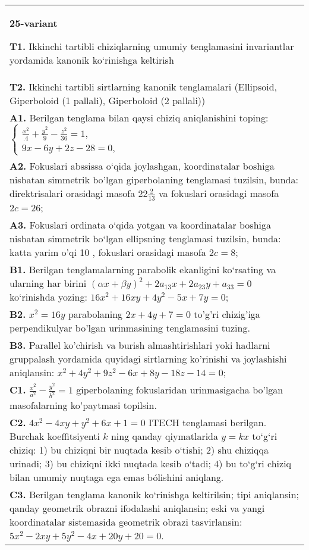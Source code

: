 \documentclass{article}
\begin{document}
\begin{tabular}{m{17cm}}
\textbf{25-variant}
\newline

\textbf{T1.} Ikkinchi tartibli chiziqlarning umumiy tenglamasini invariantlar yordamida kanonik ko‘rinishga keltirish \\
\textbf{T2.} Ikkinchi tartibli sirtlarning kanonik tenglamalari (Ellipsoid, Giperboloid (1 pallali), Giperboloid (2 pallali)) \\
\textbf{A1.} Berilgan tenglama bilan qaysi chiziq aniqlanishini toping: $\left\{\begin{array}{l}\frac{x^2}{.4}+\frac{y^2}{9}-\frac{z^2}{36}=1, \\ 9 x-6 y+2 z-28=0,\end{array}\right.$ \\
\textbf{A2.} Fokuslari abssissa o‘qida joylashgan, koordinatalar boshiga nisbatan simmetrik bo'lgan giperbolaning tenglamasi tuzilsin, bunda: direktrisalari orasidagi masofa $22 \frac{2}{13}$ va fokuslari orasidagi masofa $2 c=26$; \\
\textbf{A3.} Fokuslari ordinata o‘qida yotgan va koordinatalar boshiga nisbatan simmetrik bo‘lgan ellipsning tenglamasi tuzilsin, bunda: katta yarim o'qi 10 , fokuslari orasidagi masofa $2 c=8$; \\
\textbf{B1.} Berilgan tenglamalarning parabolik ekanligini ko‘rsating va ularning har birini $(\alpha x+\beta y)^2+2 a_{13} x+2 a_{23} y+a_{33}=0$ ko‘rinishda yozing: $16 x^2+16 x y+4 y^2-5 x+7 y=0$; \\
\textbf{B2.} $x^2=16y$ parabolaning $2x+4y+7=0$ to'g'ri chizig'iga perpendikulyar bo'lgan urinmasining tenglamasini tuzing. \\
\textbf{B3.} Parallel ko'chirish va burish almashtirishlari yoki hadlarni gruppalash yordamida quyidagi sirtlarning ko'rinishi va joylashishi aniqlansin: $x^2+4 y^2+9 z^2-6 x+8 y-18 z-14=0$; \\
\textbf{C1.} $\frac{x^2}{a^2}-\frac{y^2}{b^2}=1$ giperbolaning fokuslaridan urinmasigacha bo'lgan masofalarning ko'paytmasi topilsin. \\
\textbf{C2.} $4 x^2-4 x y+y^2+6 x+1=0$ ITECH tenglamasi berilgan. Burchak koeffitsiyenti $k$ ning qanday qiymatlarida $y=kx$ to‘g‘ri chiziq: 1) bu chiziqni bir nuqtada kesib o‘tishi; 2) shu chiziqqa urinadi; 3) bu chiziqni ikki nuqtada kesib o‘tadi; 4) bu to‘g‘ri chiziq bilan umumiy nuqtaga ega emas bólishini aniqlang. \\
\textbf{C3.} Berilgan tenglama kanonik ko‘rinishga keltirilsin; tipi aniqlansin; qanday geometrik obrazni ifodalashi aniqlansin; eski va yangi koordinatalar sistemasida geometrik obrazi tasvirlansin: $5 x^2-2 x y+5 y^2-4 x+20 y+20=0$. \\

\end{tabular}
\vspace{1cm}
\end{document}
